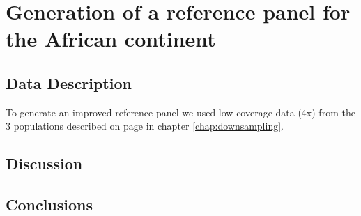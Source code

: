 \section{Generation of a reference panel for the African continent}
\label{chap:reference_panel}



\subsection{Data Description}
To generate an improved reference panel we used low coverage data (4x) from the 3 populations described on page \pageref{sec:agv_data_description} in chapter \ref{chap:downsampling}.




\subsection{Discussion}
\subsection{Conclusions}